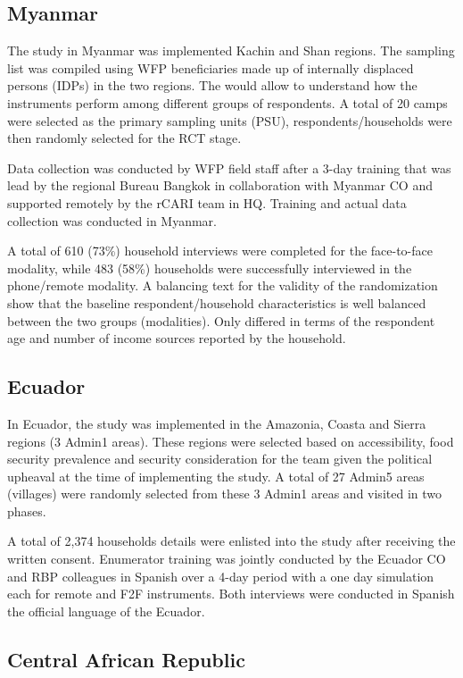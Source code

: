 \documentclass[11pt,harvard]{article}
\begin{document}
	\subsection{Myanmar}
	
The study in Myanmar was implemented Kachin and Shan regions. The sampling list was compiled using WFP beneficiaries made up of internally displaced persons (IDPs) in the two regions. The would allow to understand how the instruments perform among different groups of respondents. A total of 20 camps were selected as the primary sampling units (PSU), respondents/households were then randomly selected for the RCT stage. 

Data collection was conducted by WFP field staff after a 3-day training that was lead by the regional Bureau Bangkok in collaboration with Myanmar CO and supported remotely by the rCARI team in HQ. Training and actual data collection was conducted in Myanmar.

A total of 610 (73\%) household interviews were completed for the face-to-face modality, while 483 (58\%) households were successfully interviewed in the phone/remote modality. A balancing text for the validity of the randomization show that the baseline respondent/household characteristics is well balanced between the two groups (modalities). Only differed in terms of the respondent age and number of income sources reported by the household.

	\subsection{Ecuador}

In Ecuador, the study was implemented in the Amazonia, Coasta and Sierra regions (3 Admin1 areas). These regions were selected based on accessibility, food security prevalence and security consideration for the team given the political upheaval at the time of implementing the study.  A total of 27 Admin5 areas (villages) were randomly selected from these 3 Admin1 areas and visited in two phases. 

A total of 2,374 households details were enlisted into the study after receiving the written consent. Enumerator training was  jointly conducted by the Ecuador CO and RBP colleagues in Spanish over a 4-day period with a one day simulation each for remote and F2F instruments. Both interviews were conducted in Spanish the official language of the Ecuador. 

	
	\subsection{Central African Republic}
	
\end{document}
